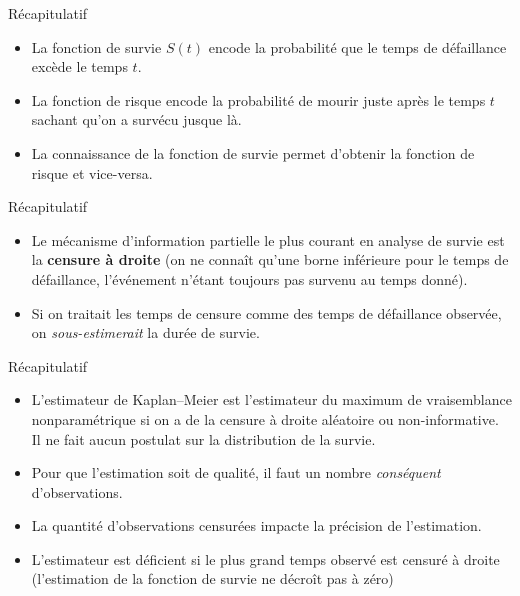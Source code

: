 \documentclass[
  ignorenonframetext,
]{beamer}
\providecommand{\tightlist}{%
  \setlength{\itemsep}{0pt}\setlength{\parskip}{0pt}}\usepackage{longtable,booktabs,array}
\begin{document}
\begin{frame}{Récapitulatif}
\protect\hypertarget{ruxe9capitulatif-1}{}
\begin{itemize}
\tightlist
\item
  La fonction de survie \(S(t)\) encode la probabilité que le temps de
  défaillance excède le temps \(t\).
\item
  La fonction de risque encode la probabilité de mourir juste après le
  temps \(t\) sachant qu'on a survécu jusque là.
\item
  La connaissance de la fonction de survie permet d'obtenir la fonction
  de risque et vice-versa.
\end{itemize}
\end{frame}

\begin{frame}{Récapitulatif}
\protect\hypertarget{ruxe9capitulatif-2}{}
\begin{itemize}
\tightlist
\item
  Le mécanisme d'information partielle le plus courant en analyse de
  survie est la \textbf{censure à droite} (on ne connaît qu'une borne
  inférieure pour le temps de défaillance, l'événement n'étant toujours
  pas survenu au temps donné).
\item
  Si on traitait les temps de censure comme des temps de défaillance
  observée, on \emph{sous-estimerait} la durée de survie.
\end{itemize}
\end{frame}

\begin{frame}{Récapitulatif}
\protect\hypertarget{ruxe9capitulatif-3}{}
\begin{itemize}
\tightlist
\item
  L'estimateur de Kaplan--Meier est l'estimateur du maximum de
  vraisemblance nonparamétrique si on a de la censure à droite aléatoire
  ou non-informative. Il ne fait aucun postulat sur la distribution de
  la survie.
\item
  Pour que l'estimation soit de qualité, il faut un nombre
  \emph{conséquent} d'observations.
\item
  La quantité d'observations censurées impacte la précision de
  l'estimation.
\item
  L'estimateur est déficient si le plus grand temps observé est censuré
  à droite (l'estimation de la fonction de survie ne décroît pas à zéro)
\end{itemize}
\end{frame}
\end{document}
